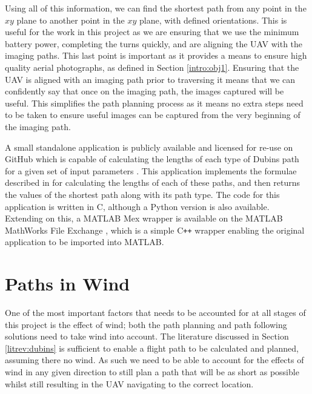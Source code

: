 Using all of this information, we can find the shortest path from any point in the $xy$ plane to another point in the $xy$ plane, with defined orientations. This is useful for the work in this project as we are ensuring that we use the minimum battery power, completing the turns quickly, and are aligning the UAV with the imaging paths. This last point is important as it provides a means to ensure high quality aerial photographs, as defined in Section \ref{intro:obj1}. Ensuring that the UAV is aligned with an imaging path prior to traversing it means that we can confidently say that once on the imaging path, the images captured will be useful. This simplifies the path planning process as it means no extra steps need to be taken to ensure useful images can be captured from the very beginning of the imaging path.

A small standalone application is publicly available and licensed for re-use on GitHub which is capable of calculating the lengths of each type of Dubins path for a given set of input parameters \cite{WalkerDubinsCurves}. This application implements the formulae described in \cite{shkel2001classification} for calculating the lengths of each of these paths, and then returns the values of the shortest path along with its path type. The code for this application is written in C, although a Python version is also available. Extending on this, a MATLAB Mex wrapper is available on the MATLAB MathWorks File Exchange \cite{MexDubinsCurves}, which is a simple C\texttt{++} wrapper enabling the original application to be imported into MATLAB.

\section{Paths in Wind}
\label{litrev:path}

One of the most important factors that needs to be accounted for at all stages of this project is the effect of wind; both the path planning and path following solutions need to take wind into account. The literature discussed in Section \ref{litrev:dubins} is sufficient to enable a flight path to be calculated and planned, assuming there no wind. As such we need to be able to account for the effects of wind in any given direction to still plan a path that will be as short as possible whilst still resulting in the UAV navigating to the correct location.

